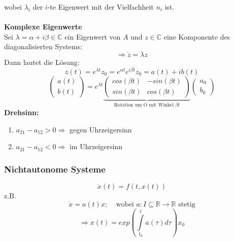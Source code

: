 \documentclass[a4paper,twocolumn,10pt]{article}
\begin{document}
wobei $\lambda_i$ der $i$-te Eigenwert mit der Vielfachheit $n_i$ ist.\\\\
\textbf{Komplexe Eigenwerte}\\
Sei $\lambda=\alpha+i\beta\in\mathbb{C}$ ein Eigenwert von $A$ und $z\in\mathbb{C}$ eine Komponente des diagonalisierten Systems:
\begin{equation*}
\Rightarrow \dot{z}=\lambda z
\end{equation*}
Dann lautet die Lösung:
\begin{equation*}
z(t)=e^{\lambda t}z_0=e^{\alpha t}e^{i\beta t}z_0=a(t)+ib(t)
\end{equation*}
\begin{equation*}
\begin{pmatrix}a(t) \\ b(t)\end{pmatrix}=e^{\lambda t}\underbrace{\begin{pmatrix}cos(\beta t) & -sin(\beta t) \\ sin(\beta t) & cos(\beta t)\end{pmatrix}}_{\text{Rotation um O mit Winkel }\beta t}\begin{pmatrix}a_0 \\ b_0\end{pmatrix}
\end{equation*}
\textbf{Drehsinn:}
\begin{enumerate}[label=$\bullet$]
\item $a_{21}-a_{12}>0\Rightarrow$ gegen Uhrzeigersinn
\item $a_{21}-a_{12}<0\Rightarrow$ im Uhrzeigersinn
\end{enumerate}

\subsubsection{Nichtautonome Systeme}
\begin{equation*}
\dot{x}(t)=f(t,x(t))
\end{equation*}
z.B.
\begin{equation*}
\dot{x}=a(t)x;\;\;\;\;\text{wobei }a:I\subseteq\mathbb{R}\rightarrow\mathbb{R}\text{ stetig}
\end{equation*}
\begin{equation*}
\Rightarrow x(t)=exp\left(\int\limits_{t_0}^{t}a(\tau)d\tau\right)x_0
\end{equation*}
\end{document}
